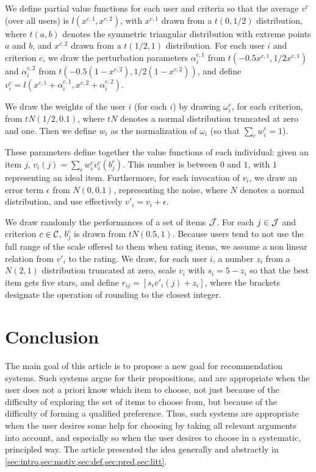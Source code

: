 \documentclass[version=3.21, pagesize, twoside=off, bibliography=totoc, DIV=calc, fontsize=12pt, a4paper, french, english]{scrartcl}
\begin{document}
We define partial value functions for each user and criteria so that the average $v^c$ (over all users) is $l(x^{c, 1}, x^{c, 2})$, with $x^{c, 1}$ drawn from a $t(0, 1/2)$ distribution, where $t(a, b)$ denotes the symmetric triangular distribution with extreme points $a$ and $b$, and $x^{c, 2}$ drawn from a $t(1/2, 1)$ distribution.
For each user $i$ and criterion $c$, we draw the perturbation parameters $\alpha^{c, 1}_i$ from $t(-0.5 x^{c, 1}, 1/2 x^{c, 1})$ and $\alpha^{c, 2}_i$ from $t(-0.5 (1-x^{c, 2}), 1/2 (1-x^{c, 2}))$, and define $v^c_i = l(x^{c, 1}+\alpha^{c, 1}_i, x^{c, 2} + \alpha^{c, 2}_i)$.

We draw the weights of the user $i$ (for each $i$) by drawing $\omega^c_i$, for each criterion, from $tN(1/2, 0.1)$, where $tN$ denotes a normal distribution truncated at zero and one. Then we define $w_i$ as the normalization of $\omega_i$ (so that $\sum_c w_i^c = 1$).

These parameters define together the value functions of each individual: given an item $j$, $v_i(j) = \sum_c w^c_i v_i^c(b^c_j)$. This number is between $0$ and $1$, with $1$ representing an ideal item. Furthermore, for each invocation of $v_i$, we draw an error term $\epsilon$ from $N(0, 0.1)$, representing the noise, where $N$ denotes a normal distribution, and use effectively $v'_i = v_i + \epsilon$.

We draw randomly the performances of a set of items $\mathcal{J}$. For each $j \in \mathcal{J}$ and criterion $c \in \mathcal{C}$, $b_j^c$ is drawn from $tN(0.5, 1)$. Because users tend to not use the full range of the scale offered to them when rating items, we assume a non linear relation from $v'_i$ to the rating. We draw, for each user $i$, a number $z_i$ from a $N(2, 1)$ distribution truncated at zero, scale $v_i$ with $s_i = 5 - z_i$ so that the best item gets five stars, and define $r_{ij} = [s_i v'_i(j) + z_i]$, where the brackets designate the operation of rounding to the closest integer. 

\section{Conclusion}
The main goal of this article is to propose a new goal for recommendation systems. Such systems argue for their propositions, and are appropriate when the user does not a priori know which item to choose, not just because of the difficulty of exploring the set of items to choose from, but because of the difficulty of forming a qualified preference. Thus, such systems are appropriate when the user desires some help for choosing by taking all relevant arguments into account, and especially so when the user desires to choose in a systematic, principled way.
The article presented the idea generally and abstractly in \cref{sec:intro,sec:motiv,sec:def,sec:pred,sec:litt}. 
\end{document}

